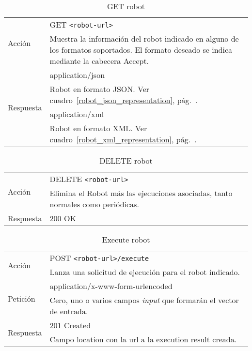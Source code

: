 \begin{table}
\begin{tabularx}{\textwidth}{l X}
\multirow{2}{*}{Acción}
 & GET \verb+<robot-url>+ \\
 & Muestra la información del robot indicado en alguno de los formatos
soportados. El formato deseado se indica mediante la cabecera Accept.\\ \hline
\multirow{4}{*}{Respuesta}
& application/json \\
& Robot en formato JSON. Ver cuadro~\ref{robot_json_representation}, pág.~\pageref{robot_json_representation}. \\ \cline{2-2}
& application/xml \\
& Robot en formato XML. Ver cuadro~\ref{robot_xml_representation}, pág.~\pageref{robot_xml_representation}. \\
\end{tabularx}
\caption{GET robot}
\label{get_robot}
\end{table}

\begin{table}
\begin{tabularx}{\textwidth}{l X}
\multirow{2}{*}{Acción}
 & DELETE \verb+<robot-url>+ \\
 & Elimina el Robot más las ejecuciones asociadas, tanto normales como
periódicas.\\ \hline
\multirow{1}{*}{Respuesta}
& 200 OK \\
\end{tabularx}
\caption{DELETE robot}
\label{delete_robot}
\end{table}

\begin{table}
\begin{tabularx}{\textwidth}{l X}
\multirow{2}{*}{Acción}
 & POST \verb+<robot-url>/execute+ \\
 & Lanza una solicitud de ejecución para el robot indicado.\\ \hline
\multirow{2}{*}{Petición}
 & application/x-www-form-urlencoded \\
 & Cero, uno o varios campos \emph{input} que formarán el vector de entrada.\\ \hline
\multirow{2}{*}{Respuesta}
& 201 Created \\
& Campo location con la url a la execution result creada.\\
\end{tabularx}
\caption{Execute robot}
\label{execute_robot}
\end{table}

